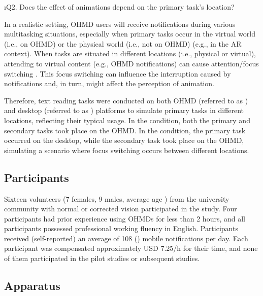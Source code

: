 \i{Q2. Does the effect of \fading{} animations depend on the primary task's location?}

In a realistic setting, OHMD users will receive notifications during various multitasking situations, especially when primary tasks occur in the virtual world (i.e., on OHMD) or the physical world (i.e., not on OHMD) (e.g., \cite{syiem_impact_2021, smith_visual_2015} in the AR context).
When tasks are situated in different locations (i.e., physical or virtual), attending to virtual content (e.g., OHMD notifications) can cause attention/focus switching \cite{gabbard_effects_2018, smith_visual_2015}.
This focus switching can influence the interruption caused by notifications and, in turn, might affect the perception of \fading{} animation.

Therefore, text reading tasks were conducted on both OHMD (referred to as \glass{}) and desktop (referred to as \desktop{}) platforms to simulate primary tasks in different locations, reflecting their typical usage. In the \glass{} condition, both the primary and secondary tasks took place on the OHMD. In the \desktop{} condition, the primary task occurred on the desktop, while the secondary task took place on the OHMD, simulating a scenario where focus switching occurs between different locations.


\subsection{Participants}
\label{sec:GradNotif:study1:participants}
  
Sixteen volunteers (7 females, 9 males, average age ) from the university community with normal or corrected vision participated in the study. Four participants had prior experience using OHMDs for less than 2 hours, and all participants possessed professional working fluency in English. Participants received (self-reported) an average of 108 () mobile notifications per day. Each participant was compensated approximately USD 7.25/h for their time, and none of them participated in the pilot studies or subsequent studies.


\subsection{Apparatus}
\label{sec:GradNotif:study1:apparatus}

